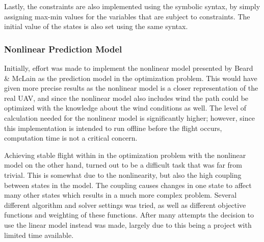 Lastly, the constraints are also implemented using the symbolic syntax, by simply assigning max-min values for the variables that are subject to constraints. The initial value of the states is also set using the same syntax. 


\subsubsection{Nonlinear Prediction Model}

Initially, effort was made to implement the nonlinear model presented by Beard \& McLain \cite{uavBEARD} as the prediction model in the optimization problem. This would have given more precise results as the nonlinear model is a closer representation of the real UAV, and since the nonlinear model also includes wind the path could be optimized with the knowledge about the wind conditions as well. The level of calculation needed for the nonlinear model is significantly higher; however, since this implementation is intended to run offline before the flight occurs, computation time is not a critical concern.

Achieving stable flight within in the optimization problem with the nonlinear model on the other hand, turned out to be a difficult task that was far from trivial. This is somewhat due to the nonlinearity, but also the high coupling between states in the model. The coupling causes changes in one state to affect many other states which results in a much more complex problem. Several different algorithm and solver settings was tried, as well as different objective functions and weighting of these functions. After many attempts the decision to use the linear model instead was made, largely due to this being a project with limited time available.
